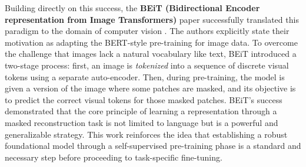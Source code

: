 Building directly on this success, the \textbf{BEiT (Bidirectional Encoder representation from Image Transformers)} \parencite{beit_bert_pretraining_image_transformers} paper successfully translated this paradigm to the domain of computer vision . The authors explicitly state their motivation as adapting the BERT-style pre-training for image data. To overcome the challenge that images lack a natural vocabulary like text, BEiT introduced a two-stage process: first, an image is \textit{tokenized} into a sequence of discrete visual tokens using a separate auto-encoder. Then, during pre-training, the model is given a version of the image where some patches are masked, and its objective is to predict the correct visual tokens for those masked patches. BEiT's success demonstrated that the core principle of learning a representation through a masked reconstruction task is not limited to language but is a powerful and generalizable strategy. This work reinforces the idea that establishing a robust foundational model through a self-supervised pre-training phase is a standard and necessary step before proceeding to task-specific fine-tuning.


